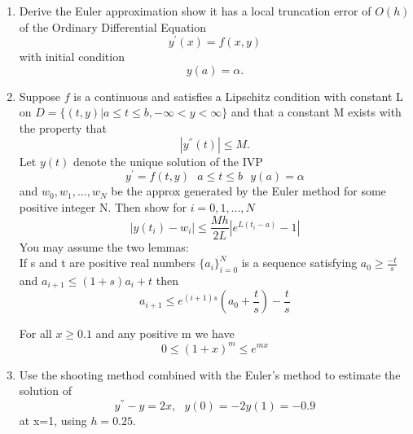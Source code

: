 \documentclass[a4paper,12pt]{article}
\theoremstyle{Qstyle}
\begin{document}
%
\makecover




\begin{enumerate}

\begin{question}{33}

\begin{enumerate}
	\item
	Derive the Euler approximation show it has a local truncation error of $O(h)$ of the Ordinary Differential Equation
	\[y^{'}(x)=f(x,y) \]
	with initial condition
	\[y(a)=\alpha. \]
	\item 
	Suppose $f$ is a continuous and satisfies a Lipschitz condition with constant
	L on $D=\{(t,y)|a\leq t \leq b, -\infty < y < \infty \}$ and that a constant M
	exists with the property that 
	\[ |y^{''}(t)|\leq M. \]
	Let $y(t)$ denote the unique solution of the IVP
	\[ y^{'}=f(t,y) \ \ \ a\leq t \leq b \ \ \ y(a)=\alpha \]
	and $w_0,w_1,...,w_N$ be the approx generated by the Euler method for some
	positive integer N.  Then show for $i=0,1,...,N$
	\[ |y(t_i)-w_i| \leq \frac{Mh}{2L}|e^{L(t_i-a)}-1| \]
	You may assume the two lemmas:\\
	If s and t are positive real numbers $\{a_i\}_{i=0}^{N}$ is a sequence satisfying $a_0 \geq \frac{-t}{s}$ and $a_{i+1} \leq (1+s)a_i +t $
	then
	\[a_{i+1} \leq e^{(i+1)s}\left(a_0+\frac{t}{s}\right)-\frac{t}{s} \]
	
	For all $ x \geq 0.1$ and any positive m we have \[0\leq (1+x)^m \leq e^{mx}\]
	\item
	Use the shooting method combined with the Euler's method to estimate the solution of
	\[ y^{''}-y=2x, \ \ \ y(0)=-2 y(1)=-0.9 \]
	at x=1, using $h=0.25$.
\end{enumerate}

\end{question}


\end{enumerate}
\end{document}
